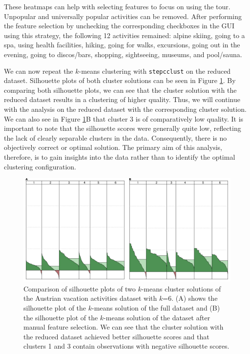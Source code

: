 \documentclass[article]{ajs}
\begin{document}
These heatmaps can help with selecting features to focus on using the tour. Unpopular and universally popular activities can be removed. After performing the feature selection by unchecking the corresponding checkboxes in the GUI using this strategy, the following 12 activities remained: alpine skiing, going to a spa, using health facilities, hiking, going for walks, excursions, going out in the evening, going to discos/bars, shopping, sightseeing, museums, and pool/sauna.

We can now repeat the $k$-means clustering with \texttt{stepcclust} on the reduced dataset. Silhouette plots of both cluster solutions can be seen in Figure \ref{fig:silhouette_comparison}. By comparing both silhouette plots, we can see that the cluster solution with the reduced dataset results in a clustering of higher quality. Thus, we will continue with the analysis on the reduced dataset with the corresponding cluster solution. We can also see in Figure \ref{fig:silhouette_comparison}B that cluster 3 is of comparatively low quality. It is important to note that the silhouette scores were generally quite low, reflecting the lack of clearly separable clusters in the data. Consequently, there is no objectively correct or optimal solution. The primary aim of this analysis, therefore, is to gain insights into the data rather than to identify the optimal clustering configuration.

\begin{figure}[h!]
    \centering
    \includegraphics[width=1\textwidth]{silhouette_comparison.png}
    \caption{Comparison of silhouette plots of two $k$-means cluster solutions of the Austrian vacation activities dataset with $k$=6. (A) shows the silhouette plot of the $k$-means solution of the full dataset and (B) the silhouette plot of the $k$-means solution of the dataset after manual feature selection. We can see that the cluster solution with the reduced dataset achieved better silhouette scores and that clusters 1 and 3 contain observations with negative silhouette scores.}
    \label{fig:silhouette_comparison}
\end{figure}
\end{document}
